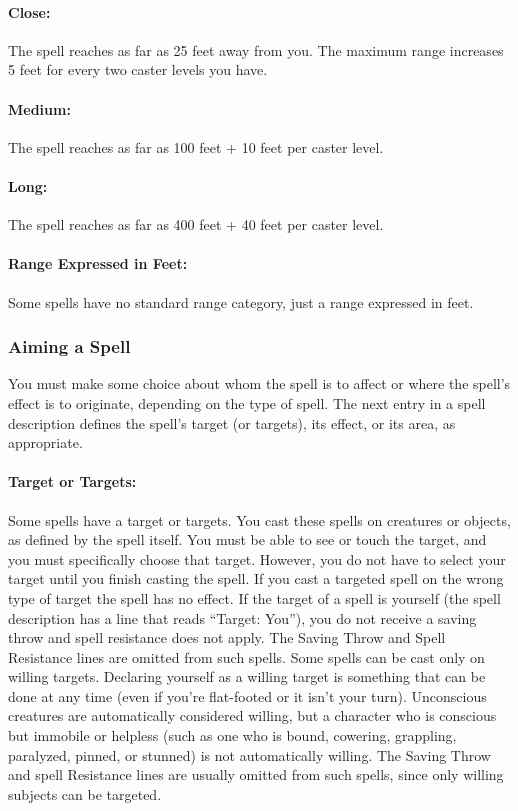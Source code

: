 \documentclass[../VancianToPsionics.tex]{subfiles}
\begin{document}
\paragraph{Close:} The spell reaches as far as 25 feet away from you. The maximum range increases 5 feet for every two caster levels you have.

\paragraph{Medium:} The spell reaches as far as 100 feet + 10 feet per caster level.

\paragraph{Long:} The spell reaches as far as 400 feet + 40 feet per caster level.

\paragraph{Range Expressed in Feet:} Some spells have no standard range category, just a range expressed in feet.

\subsubsection{Aiming a Spell}
You must make some choice about whom the spell is to affect or where the spell's effect is to originate, 
depending on the type of spell. The next entry in a spell description defines the spell's target (or targets), its effect, or its area, as appropriate.

\paragraph{Target or Targets:} Some spells have a target or targets. You cast these spells on creatures or objects, as defined by the spell itself. 
You must be able to see or touch the target, and you must specifically choose that target. 
However, you do not have to select your target until you finish casting the spell.
If you cast a targeted spell on the wrong type of target the spell has no effect. 
If the target of a spell is yourself (the spell description has a line that reads ``Target: You''), 
you do not receive a saving throw and spell resistance does not apply. 
The Saving Throw and Spell Resistance lines are omitted from such spells.
Some spells can be cast only on willing targets. 
Declaring yourself as a willing target is something that can be done at any time (even if you're flat-footed or it isn't your turn). 
Unconscious creatures are automatically considered willing, but a character who is conscious but immobile or helpless (such as one who is bound, cowering, grappling, paralyzed, pinned, or stunned) is not automatically willing. 
The Saving Throw and spell Resistance lines are usually omitted from such spells, since only willing subjects can be targeted.
\end{document}
